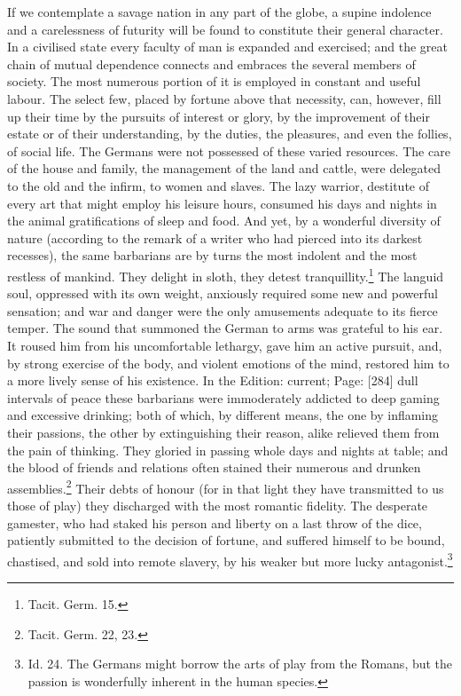 If we contemplate a savage nation in any part of the globe, a supine indolence and a carelessness of futurity will be found to constitute their general character. In a civilised state every faculty of man is expanded and exercised; and the great chain of mutual dependence connects and embraces the several members of society. The most numerous portion of it is employed in constant and useful labour. The select few, placed by fortune above that necessity, can, however, fill up their time by the pursuits of interest or glory, by the improvement of their estate or of their understanding, by the duties, the pleasures, and even the follies, of social life. The Germans were not possessed of these varied resources. The care of the house and family, the management of the land and cattle, were delegated to the old and the infirm, to women and slaves. The lazy warrior, destitute of every art that might employ his leisure hours, consumed his days and nights in the animal gratifications of sleep and food. And yet, by a wonderful diversity of nature (according to the remark of a writer who had pierced into its darkest recesses), the same barbarians are by turns the most indolent and the most restless of mankind. They delight in sloth, they detest tranquillity.\footnote{Tacit. Germ. 15.} The languid soul, oppressed with its own weight, anxiously required some new and powerful sensation; and war and danger were the only amusements adequate to its fierce temper. The sound that summoned the German to arms was grateful to his ear. It roused him from his uncomfortable lethargy, gave him an active pursuit, and, by strong exercise of the body, and violent emotions of the mind, restored him to a more lively sense of his existence. In the Edition: current; Page: [284] dull intervals of peace these barbarians were immoderately addicted to deep gaming and excessive drinking; both of which, by different means, the one by inflaming their passions, the other by extinguishing their reason, alike relieved them from the pain of thinking. They gloried in passing whole days and nights at table; and the blood of friends and relations often stained their numerous and drunken assemblies.\footnote{Tacit. Germ. 22, 23.} Their debts of honour (for in that light they have transmitted to us those of play) they discharged with the most romantic fidelity. The desperate gamester, who had staked his person and liberty on a last throw of the dice, patiently submitted to the decision of fortune, and suffered himself to be bound, chastised, and sold into remote slavery, by his weaker but more lucky antagonist.\footnote{Id. 24. The Germans might borrow the arts of play from the Romans, but the passion is wonderfully inherent in the human species.}

